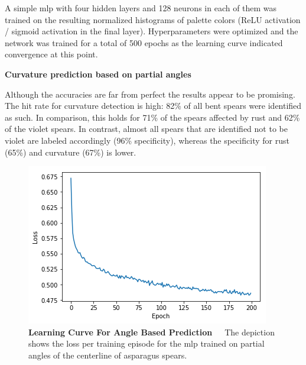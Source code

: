 A simple \acrshort{mlp} with four hidden layers and 128 neurons in each of them was trained on the resulting normalized histograms of palette colors (ReLU activation / sigmoid activation in the final layer). Hyperparameters were optimized and the network was trained for a total of 500 epochs as the learning curve indicated convergence at this point.

\bigskip
\textbf{Curvature prediction based on partial angles} 

Although the accuracies are far from perfect the results appear to be promising. The hit rate for curvature detection is high: 82\% of all bent spears were identified as such. In comparison, this holds for 71\% of the spears affected by rust and 62\% of the violet spears. In contrast, almost all spears that are identified not to be violet are labeled accordingly (96\% specificity), whereas the specificity for rust (65\%) and curvature (67\%) is lower.

\begin{table}[!h]
	\centering
	\caption[Feature Engineering Curvature Prediction]{\textbf{Curvature Prediction}~~~Performance of curvature prediction based on angles}
	\label{tab:performance_angle_based}
\end{table}

\begin{figure}[!hb]
	\centering
	\includegraphics[scale=0.7]{Figures/chapter04/fe_curve.png}
	\decoRule
	\caption[Feature Engineering Learning Curve For Angle Based Prediction]{\textbf{Learning Curve For Angle Based Prediction}~~~The depiction shows the loss per training episode for the \acrshort{mlp} trained on partial angles of the centerline of asparagus spears.}
	\label{fig:FeatureEngineeringCurve}
\end{figure}

